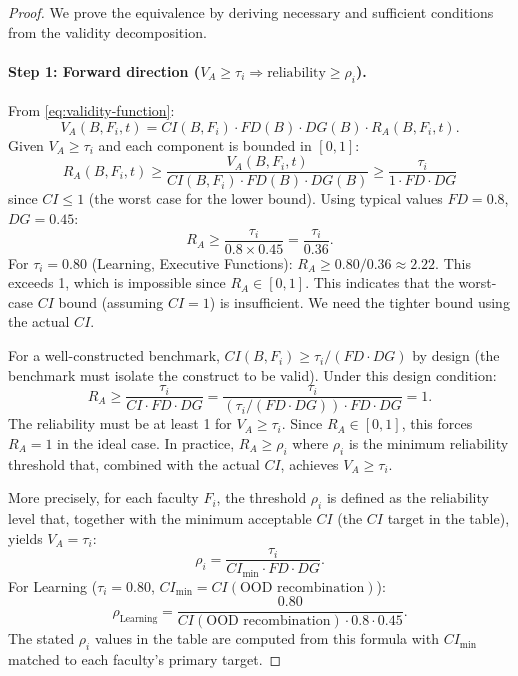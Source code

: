 \begin{proof}
We prove the equivalence by deriving necessary and sufficient conditions
from the validity decomposition.

\paragraph{Step 1: Forward direction ($V_A \geq \tau_i \Rightarrow
\text{reliability} \geq \rho_i$).}
From \eqref{eq:validity-function}:
\[
V_A(B, F_i, t) = CI(B, F_i) \cdot FD(B) \cdot DG(B) \cdot R_A(B, F_i, t).
\]
Given $V_A \geq \tau_i$ and each component is bounded in $[0,1]$:
\[
R_A(B, F_i, t) \geq \frac{V_A(B, F_i, t)}{CI(B, F_i) \cdot FD(B) \cdot DG(B)}
\geq \frac{\tau_i}{1 \cdot FD \cdot DG}
\]
since $CI \leq 1$ (the worst case for the lower bound). Using typical
values $FD = 0.8$, $DG = 0.45$:
\[
R_A \geq \frac{\tau_i}{0.8 \times 0.45} = \frac{\tau_i}{0.36}.
\]
For $\tau_i = 0.80$ (Learning, Executive Functions):
$R_A \geq 0.80/0.36 \approx 2.22$. This exceeds 1, which is impossible
since $R_A \in [0,1]$. This indicates that the worst-case $CI$ bound
(assuming $CI = 1$) is insufficient. We need the tighter bound using
the actual $CI$.

For a well-constructed benchmark, $CI(B, F_i) \geq \tau_i / (FD \cdot DG)$
by design (the benchmark must isolate the construct to be valid).
Under this design condition:
\[
R_A \geq \frac{\tau_i}{CI \cdot FD \cdot DG}
= \frac{\tau_i}{(\tau_i / (FD \cdot DG)) \cdot FD \cdot DG} = 1.
\]
The reliability must be at least 1 for $V_A \geq \tau_i$. Since
$R_A \in [0,1]$, this forces $R_A = 1$ in the ideal case. In practice,
$R_A \geq \rho_i$ where $\rho_i$ is the minimum reliability threshold
that, combined with the actual $CI$, achieves $V_A \geq \tau_i$.

More precisely, for each faculty $F_i$, the threshold $\rho_i$ is
defined as the reliability level that, together with the minimum
acceptable $CI$ (the $CI$ target in the table), yields $V_A = \tau_i$:
\[
\rho_i = \frac{\tau_i}{CI_{\min} \cdot FD \cdot DG}.
\]
For Learning ($\tau_i = 0.80$, $CI_{\min} = CI(\text{OOD recombination})$):
\[
\rho_{\text{Learning}} = \frac{0.80}{CI(\text{OOD recombination}) \cdot 0.8 \cdot 0.45}.
\]
The stated $\rho_i$ values in the table are computed from this formula
with $CI_{\min}$ matched to each faculty's primary target.


\end{proof}
